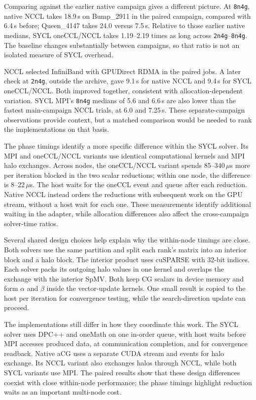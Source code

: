 Comparing against the earlier native campaign gives a different picture. At \texttt{8n4g}, native NCCL takes 18.9\,s on Bump\_2911 in the paired campaign, compared with 6.4\,s before; Queen\_4147 takes 24.0 versus 7.5\,s. Relative to those earlier native medians, SYCL oneCCL/NCCL takes 1.19--2.19 times as long across \texttt{2n4g}--\texttt{8n4g}. The baseline changes substantially between campaigns, so that ratio is not an isolated measure of SYCL overhead.

NCCL selected InfiniBand with GPUDirect RDMA in the paired jobs. A later check at \texttt{2n4g}, outside the archive, gave 9.1\,s for native NCCL and 9.4\,s for SYCL oneCCL/NCCL. Both improved together, consistent with allocation-dependent variation. SYCL MPI's \texttt{8n4g} medians of 5.6 and 6.6\,s are also lower than the fastest main-campaign NCCL trials, at 6.0 and 7.25\,s. These separate-campaign observations provide context, but a matched comparison would be needed to rank the implementations on that basis.

The phase timings identify a more specific difference within the SYCL solver. Its MPI and oneCCL/NCCL variants use identical computational kernels and MPI halo exchanges. Across nodes, the oneCCL/NCCL variant spends 85--340\,$\mu$s more per iteration blocked in the two scalar reductions; within one node, the difference is 8--22\,$\mu$s. The host waits for the oneCCL event and queue after each reduction. Native NCCL instead orders the reductions with subsequent work on the GPU stream, without a host wait for each one. These measurements identify additional waiting in the adapter, while allocation differences also affect the cross-campaign solver-time ratios.

Several shared design choices help explain why the within-node timings are close. Both solvers use the same partition and split each rank's matrix into an interior block and a halo block. The interior product uses cuSPARSE with 32-bit indices. Each solver packs its outgoing halo values in one kernel and overlaps the exchange with the interior SpMV. Both keep CG scalars in device memory and form $\alpha$ and $\beta$ inside the vector-update kernels. One small result is copied to the host per iteration for convergence testing, while the search-direction update can proceed.

The implementations still differ in how they coordinate this work. The SYCL solver uses DPC++ and oneMath on one in-order queue, with host waits before MPI accesses produced data, at communication completion, and for convergence readback. Native aCG uses a separate CUDA stream and events for halo exchange. Its NCCL variant also exchanges halos through NCCL, while both SYCL variants use MPI. The paired results show that these design differences coexist with close within-node performance; the phase timings highlight reduction waits as an important multi-node cost.

